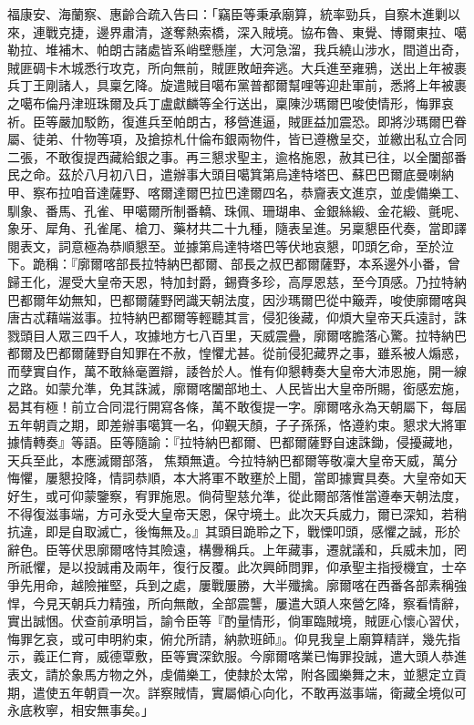 \begin{pinyinscope}
福康安、海蘭察、惠齡合疏入告曰：「竊臣等秉承廟算，統率勁兵，自察木進剿以來，連戰克捷，邊界肅清，遂奪熱索橋，深入賊境。協布魯、東覺、博爾東拉、噶勒拉、堆補木、帕朗古諸處皆系峭壁懸崖，大河急溜，我兵繞山涉水，間道出奇，賊匪碉卡木城悉行攻克，所向無前，賊匪敗衄奔逃。大兵進至雍鴉，送出上年被裹兵丁王剛諸人，具稟乞降。旋遣賊目噶布黨普都爾幫哩等迎赴軍前，悉將上年被裹之噶布倫丹津班珠爾及兵丁盧獻麟等全行送出，稟陳沙瑪爾巴唆使情形，悔罪哀祈。臣等嚴加駁飭，復進兵至帕朗古，移營進逼，賊匪益加震恐。即將沙瑪爾巴眷屬、徒弟、什物等項，及搶掠札什倫布銀兩物件，皆已遵檄呈交，並繳出私立合同二張，不敢復提西藏給銀之事。再三懇求聖主，逾格施恩，赦其已往，以全闔部番民之命。茲於八月初八日，遣辦事大頭目噶箕第烏達特塔巴、蘇巴巴爾底曼喇納甲、察布拉咱音達薩野、喀爾達爾巴拉巴達爾四名，恭齎表文進京，並虔備樂工、馴象、番馬、孔雀、甲噶爾所制番轎、珠佩、珊瑚串、金銀絲緞、金花緞、氈呢、象牙、犀角、孔雀尾、槍刀、藥材共二十九種，隨表呈進。另稟懇臣代奏，當即譯閱表文，詞意極為恭順懇至。並據第烏達特塔巴等伏地哀懇，叩頭乞命，至於泣下。跪稱：『廓爾喀部長拉特納巴都爾、部長之叔巴都爾薩野，本系邊外小番，曾歸王化，渥受大皇帝天恩，特加封爵，錫賚多珍，高厚恩慈，至今頂感。乃拉特納巴都爾年幼無知，巴都爾薩野罔識天朝法度，因沙瑪爾巴從中簸弄，唆使廓爾喀與唐古忒藉端滋事。拉特納巴都爾等輕聽其言，侵犯後藏，仰煩大皇帝天兵遠討，誅戮頭目人眾三四千人，攻據地方七八百里，天威震疊，廓爾喀膽落心驚。拉特納巴都爾及巴都爾薩野自知罪在不赦，惶懼尤甚。從前侵犯藏界之事，雖系被人煽惑，而孽實自作，萬不敢絲毫置辯，諉咎於人。惟有仰懇轉奏大皇帝大沛恩施，開一線之路。如蒙允準，免其誅滅，廓爾喀闔部地土、人民皆出大皇帝所賜，銜感宏施，曷其有極！前立合同混行開寫各條，萬不敢復提一字。廓爾喀永為天朝屬下，每屆五年朝貢之期，即差辦事噶箕一名，仰覲天顏，子子孫孫，恪遵約束。懇求大將軍據情轉奏』等語。臣等隨諭：『拉特納巴都爾、巴都爾薩野自速誅鋤，侵擾藏地，天兵至此，本應滅爾部落，焦類無遺。今拉特納巴都爾等敬凜大皇帝天威，萬分悔懼，屢懇投降，情詞恭順，本大將軍不敢壅於上聞，當即據實具奏。大皇帝如天好生，或可仰蒙鑒察，宥罪施恩。倘荷聖慈允準，從此爾部落惟當遵奉天朝法度，不得復滋事端，方可永受大皇帝天恩，保守境土。此次天兵威力，爾已深知，若稍抗違，即是自取滅亡，後悔無及。』其頭目跪聆之下，戰慄叩頭，感懼之誠，形於辭色。臣等伏思廓爾喀恃其險遠，構釁稱兵。上年藏事，遷就議和，兵威未加，罔所祇懼，是以投誠甫及兩年，復行反覆。此次興師問罪，仰承聖主指授機宜，士卒爭先用命，越險摧堅，兵到之處，屢戰屢勝，大半殲擒。廓爾喀在西番各部素稱強悍，今見天朝兵力精強，所向無敵，全部震讋，屢遣大頭人來營乞降，察看情辭，實出誠悃。伏查前承明旨，諭令臣等『酌量情形，倘軍臨賊境，賊匪心懷心習伏，悔罪乞哀，或可申明約束，俯允所請，納款班師』。仰見我皇上廟算精詳，幾先指示，義正仁育，威德覃敷，臣等實深欽服。今廓爾喀業已悔罪投誠，遣大頭人恭進表文，請於象馬方物之外，虔備樂工，使隸於太常，附各國樂舞之末，並懇定立貢期，遣使五年朝貢一次。詳察賊情，實屬傾心向化，不敢再滋事端，衛藏全境似可永底敉寧，相安無事矣。」


\end{pinyinscope}

